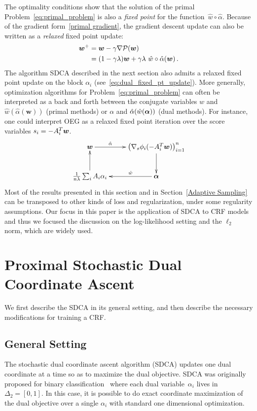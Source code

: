 The optimality conditions show that the solution of the primal Problem~\eqref{eq:primal_problem} is also a \emph{fixed point} for the function~$\hat w \circ \hat \alpha$.
Because of the gradient form~\eqref{primal gradient}, the gradient descent update can also be written as a \emph{relaxed} fixed point update:
\begin{align}
		\boldsymbol{w}^+
		& = \boldsymbol{w} - \gamma \nabla {\mathcal P}(\boldsymbol{w}) \\
		& = (1-\gamma \lambda) \boldsymbol{w}  + \gamma \lambda \,\, \hat w \circ \hat \alpha (\boldsymbol{w}) \, .
\end{align}
The algorithm SDCA described in the next section also admits a relaxed fixed point update on the block $\alpha_i$ (see~\eqref{eq:dual_fixed_pt_update}).
More generally, optimization algorithms for Problem~\eqref{eq:primal_problem} can often be interpreted as a back and forth between the conjugate variables $w$ and $\hat w(\hat \alpha(\bm w))$ (primal methods) or $\alpha$ and $\hat \alpha(\hat w( \boldsymbol{\alpha}))$ (dual methods).
For instance, one could interpret OEG as a relaxed fixed point iteration over the score variables $s_i = -A_i^T\boldsymbol{w}$.
\begin{displaymath}
    \xymatrix{
    	\bm w \ar[r]^-{\hat{\alpha}}
    	&   \left( \nabla_s \phi_i(-A_i^T \bm w) \right)_{i=1}^n \ar[d] \\
		\frac{1}{n \lambda} \sum_i A_i \alpha_i  \ar[u]
		&  \balpha \ar[l]_-{\hat{w}}
	}
\end{displaymath}
Most of the results presented in this section and in Section~\ref{Adaptive Sampling} can be transposed to other kinds of loss and regularization, under some regularity assumptions.
Our focus in this paper is the application of SDCA to CRF models and thus we focused the discussion on the log-likelihood setting and the $\ell_2$ norm, which are widely used.


\section{Proximal Stochastic Dual Coordinate Ascent} \label{sec:SDCA}

We first describe the SDCA in its general setting, and then describe the necessary modifications for training a CRF.

\subsection{General Setting}
The stochastic dual coordinate ascent algorithm (SDCA) updates one dual coordinate at a time so as to maximize the dual objective.
SDCA was originally proposed for binary classification~\citep{shalev-shwartz_stochastic_2013} where each dual variable~$\alpha_i$ lives in $\Delta_2 = [0,1]$.
In this case, it is possible to do exact coordinate maximization of the dual objective over a single $\alpha_i$ with standard one dimensional optimization.


